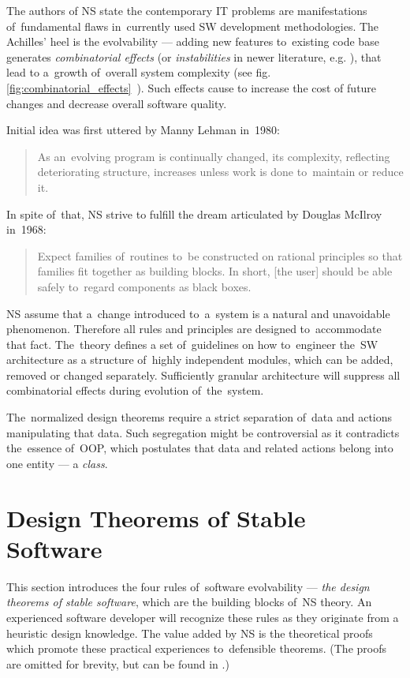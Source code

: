 \documentclass[thesis=M,english,hidelinks]{FITthesis}[2012/10/20]
\begin{document}
The authors of \acrlong{NS} state the contemporary \acrshort{IT} problems are manifestations of~fundamental flaws in~currently used \acrshort{SW} development methodologies. The Achilles' heel is the evolvability --- adding new features to~existing code base generates \emph{combinatorial effects} (or \textit{instabilities} in newer literature, e.g. \cite{ns-toward-general-theory}), that lead to a~growth of~overall system complexity (see fig. \ref{fig:combinatorial_effects}~\cite{ns-recreating}). Such effects cause to increase the cost of future changes and decrease overall software quality.\cite{ns-recreating}

Initial idea was first uttered by Manny Lehman in~1980:
\begin{quote}
    As an~evolving program is continually changed, its complexity, reflecting deteriorating structure, increases unless work is done to~maintain or reduce it.~\cite{lehman-1980-programs}
\end{quote}

In spite of~that, \acrlong{NS} strive to fulfill the dream articulated by Douglas McIlroy in~1968:
\begin{quote}
    Expect families of~routines to~be constructed on rational principles so that families fit together as building blocks. In short, [the user] should be able safely to~regard components as black boxes.~\cite{mcilroy-1968-mass-software}
\end{quote}

\acrshort{NS} assume that a~change introduced to~a~system is a natural and unavoidable phenomenon. Therefore all rules and principles are designed to~accommodate that fact. The~theory defines a set of~guidelines on how to~engineer the~\acrlong{SW} architecture as a structure of~highly independent modules, which can be added, removed or changed separately. Sufficiently granular architecture will suppress all combinatorial effects during evolution of~the~system.

The~normalized design theorems require a strict separation of~data and actions manipulating that data. Such segregation might be controversial as it contradicts the~essence of~\acrfull{OOP}, which postulates that data and related actions belong into one entity --- a \textit{class}.

% 
% 
\section{Design Theorems of Stable Software}
\label{sec:theorems}
This section introduces the four rules of~software evolvability --- \textit{the design theorems of stable software}, which are the building blocks of~\acrshort{NS} theory. An experienced software developer will recognize these rules as they originate from a heuristic design knowledge. The value added by \acrshort{NS} is the theoretical proofs which promote these practical experiences to~defensible theorems. (The proofs are omitted for brevity, but can be found in \cite{ns-recreating, ns-toward-general-theory}.)
\end{document}
